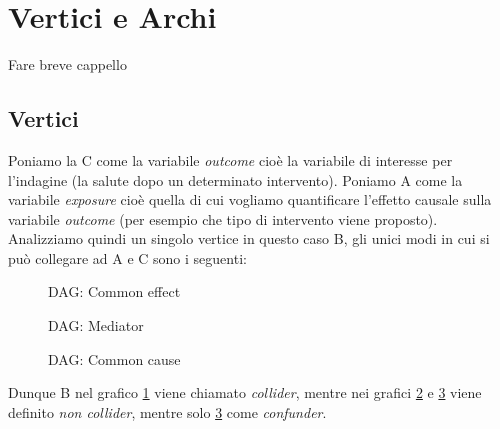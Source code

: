 


\section{Vertici e Archi}
Fare breve cappello

\subsection{Vertici}

Poniamo la C come la variabile \textit{outcome} cioè la variabile di interesse per l'indagine (la salute dopo un determinato intervento). Poniamo A come la variabile \textit{exposure} cioè quella di cui vogliamo quantificare l'effetto causale sulla variabile \textit{outcome} (per esempio che tipo di intervento viene proposto). Analizziamo quindi un singolo vertice in questo caso B, gli unici modi in cui si può collegare ad A e C sono i seguenti: 
\begin{figure}[H]
\centering    
\caption{DAG: Common effect}
\label{DAG:Common effect}
\end{figure} 
\begin{figure}[H]
	\centering
\caption{DAG: Mediator}
\label{DAG:Mediator}
\end{figure} 
\begin{figure}[H]
	\centering
\caption{DAG: Common cause}
\label{DAG:Common cause}
\end{figure}
Dunque B nel grafico \ref{DAG:Common effect} viene chiamato \textit{collider}, mentre nei grafici \ref{DAG:Mediator} e \ref{DAG:Common cause} viene definito \textit{non collider}, mentre solo \ref{DAG:Common cause} come \textit{confunder}.
